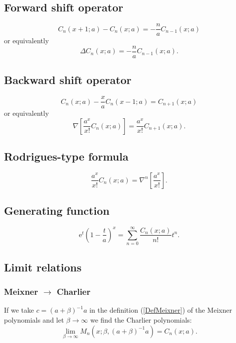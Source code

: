 \documentclass[envcountchap,graybox]{svmono}
\newcommand{\e}{\textrm{e}}
\begin{document}
\subsection*{Forward shift operator}
\begin{equation}
\label{shift1CharlierI}
C_n(x+1;a)-C_n(x;a)=-\frac{n}{a}C_{n-1}(x;a)
\end{equation}
or equivalently
\begin{equation}
\label{shift1CharlierII}
\Delta C_n(x;a)=-\frac{n}{a}C_{n-1}(x;a).
\end{equation}

\subsection*{Backward shift operator}
\begin{equation}
\label{shift2CharlierI}
C_n(x;a)-\frac{x}{a}C_n(x-1;a)=C_{n+1}(x;a)
\end{equation}
or equivalently
\begin{equation}
\label{shift2CharlierII}
\nabla\left[\frac{a^x}{x!}C_n(x;a)\right]=\frac{a^x}{x!}C_{n+1}(x;a).
\end{equation}

\subsection*{Rodrigues-type formula}
\begin{equation}
\label{RodCharlier}
\frac{a^x}{x!}C_n(x;a)=\nabla^n\left[\frac{a^x}{x!}\right].
\end{equation}

\subsection*{Generating function}
\begin{equation}
\label{GenCharlier}
\e^t\left(1-\frac{t}{a}\right)^x=\sum_{n=0}^{\infty}\frac{C_n(x;a)}{n!}t^n.
\end{equation}

\subsection*{Limit relations}

\subsubsection*{Meixner $\rightarrow$ Charlier}
If we take $c=(a+\beta)^{-1}a$ in the definition (\ref{DefMeixner}) of the Meixner polynomials
and let $\beta\rightarrow\infty$ we find the Charlier polynomials:
$$\lim_{\beta\rightarrow\infty}M_n(x;\beta,(a+\beta)^{-1}a)=C_n(x;a).$$
\end{document}
